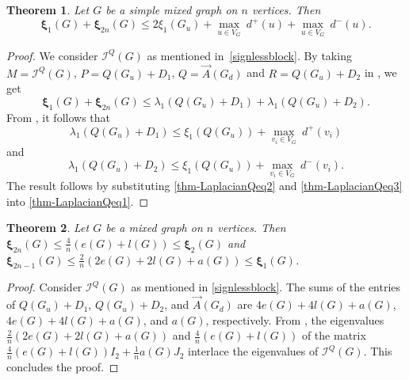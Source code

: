\documentclass[12pt]{article}
\numberwithin{equation}{section}
\newtheorem{thm}{Theorem}[section]
\begin{document}
	\begin{thm}\label{thm-LaplacianQ}
		Let $G$ be a simple mixed graph on $n$ vertices. Then $$\bm{\xi}_1(G)+\bm{\xi}_{2n}(G)\leq 2\xi_1(G_u)+\underset{u\in V_G}{\max}~d^+(u)+\underset{u\in V_G}{\max}~d^-(u).$$
	\end{thm}
	\begin{proof}
	 We consider $\mathcal{I}^Q(G)$ as mentioned in~\eqref{signlessblock}.	
		By taking $M=\mathcal{I}^Q(G)$, $P=Q(G_u)+D_1$, $Q=\vec{A}(G_d)$ and $R=Q(G_u)+D_2$ in \cite[Proposition~1.3.16]{cvetkovic}, we get \begin{equation}\label{thm-LaplacianQeq1}
		\bm{\xi}_1(G)+\bm{\xi}_{2n}(G)\leq \lambda_1(Q(G_u)+D_1)+\lambda_1(Q(G_u)+D_2).
		\end{equation}
		From \cite[Lemma~3.19]{bapatbook}, it follows that \begin{equation}\label{thm-LaplacianQeq2}
			\displaystyle\lambda_1(Q(G_u)+D_1)\leq \xi_1(Q(G_u))+\underset{v_i\in V_G}{\max}~d^+(v_i)
		\end{equation}
		 and 
		 \begin{equation}\label{thm-LaplacianQeq3}
		 	\displaystyle\lambda_1(Q(G_u)+D_2)\leq \xi_1(Q(G_u))+\underset{v_i\in V_G}{\max}~d^-(v_i).\end{equation}
		 The result follows by substituting \eqref{thm-LaplacianQeq2} and \eqref{thm-LaplacianQeq3} into \eqref{thm-LaplacianQeq1}.
	\end{proof}
	
	\begin{thm}
		Let $G$ be a mixed graph on $n$ vertices. Then $\bm{\xi}_{2n}(G)\leq\displaystyle\frac{4}{n}(e(G)+l(G))\leq\bm{\xi}_2(G)$ and 
		$\bm{\xi}_{2n-1}(G)\leq\displaystyle\frac{2}{n}(2e(G)+2l(G)+a(G))\leq\bm{\xi}_1(G)$.
	\end{thm}
	\begin{proof}
		Consider $\mathcal{I}^Q(G)$ as mentioned in \eqref{signlessblock}.
		The sums of the entries of $Q(G_u)+D_1$, $Q(G_u)+D_2$, and $\vec{A}(G_d)$ are $4e(G)+4l(G)+a(G)$, $4e(G)+4l(G)+a(G)$, and $a(G)$, respectively. From \cite[Corollary~1.3.13]{cvetkovic}, the eigenvalues $\frac{2}{n}(2e(G)+2l(G)+a(G))$ and $\frac{4}{n}(e(G)+l(G))$ of the matrix $\frac{4}{n}(e(G)+l(G))I_2+\frac{1}{n}a(G)J_2$ interlace the eigenvalues of $\mathcal{I}^Q(G)$. This concludes the proof.
	\end{proof}
	
\end{document}
